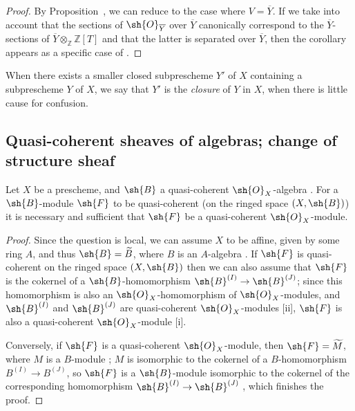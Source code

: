 \begin{proof}
By Proposition~, we can reduce to the case where $V=\overline{Y}$.
If we take into account that the sections of $\sh{O}_{\overline{Y}}$ over $\overline{Y}$ canonically correspond to the $\overline{Y}$-sections of $\overline{Y}\otimes_{\mathbb Z}\mathbb Z[T]$  and that the latter is separated over $\overline{Y}$, then the corollary appears as a specific case of .
\end{proof}

When there exists a smaller closed subprescheme $Y'$ of $X$ containing a subprescheme $Y$ of $X$, we say that $Y'$ is the \emph{closure} of $Y$ in $X$, when there is little cause for confusion.

\subsection{Quasi-coherent sheaves of algebras; change of structure sheaf}
\label{subsection:I.9.6}
\label{I.9.6}

\begin{proposition}[9.6.1]
\label{I.9.6.1}
Let $X$ be a prescheme, and $\sh{B}$ a quasi-coherent $\sh{O}_X$-algebra .
For a $\sh{B}$-module $\sh{F}$ to be quasi-coherent (on the ringed space $(X,\sh{B})$) it is necessary and sufficient that $\sh{F}$ be a quasi-coherent $\sh{O}_X$-module.
\end{proposition}

\begin{proof}
Since the question is local, we can assume $X$ to be affine, given by some ring $A$, and thus $\sh{B}=\widetilde{B}$, where $B$ is an $A$-algebra .
If $\sh{F}$ is quasi-coherent on the ringed space $(X,\sh{B})$ then we can also assume that $\sh{F}$ is the cokernel of a $\sh{B}$-homomorphism $\sh{B}^{(I)}\to\sh{B}^{(J)}$; since this homomorphism is also an $\sh{O}_X$-homomorphism of $\sh{O}_X$-modules, and $\sh{B}^{(I)}$ and $\sh{B}^{(J)}$ are quasi-coherent $\sh{O}_X$-modules [ii], $\sh{F}$ is also a quasi-coherent $\sh{O}_X$-module [i].

Conversely, if $\sh{F}$ is a quasi-coherent $\sh{O}_X$-module, then $\sh{F}=\widetilde{M}$, where $M$ is a $B$-module ; $M$ is isomorphic to the cokernel of a $B$-homomorphism $B^{(I)}\to B^{(J)}$, so $\sh{F}$ is a $\sh{B}$-module isomorphic to the cokernel of the corresponding homomorphism $\sh{B}^{(I)}\to\sh{B}^{(J)}$ , which finishes the proof.
\end{proof}

